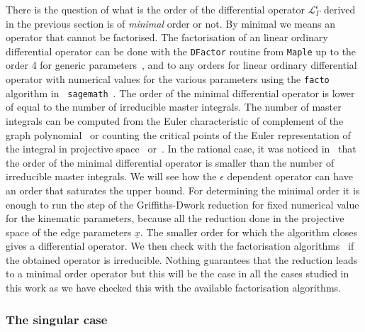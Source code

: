 \documentclass[a4paper,12pt]{article}
\numberwithin{equation}{section}
\numberwithin{figure}{section}
\begin{document}
There is the question of what is the order of the differential
operator  $\mathscr{L}_\Gamma^\epsilon$  derived in the previous
section is of \emph{minimal} order or not.  By minimal we means an
operator that cannot be factorised. The factorisation of an linear ordinary
differential operator can be done with the {\tt DFactor} routine from
{\tt Maple} up to the order 4 for generic parameters~\cite{PutSinger,vanHoeij}, and to any
orders for linear  ordinary
differential operator with numerical values for the various parameters
using the {\tt facto} algorithm in {\tt
	sagemath}~\cite{chyzak2022symbolic,goyer2021sage}.
The order of the minimal differential operator is lower of equal to
the number of irreducible master integrals. The number of master
integrals  can be computed from the Euler
characteristic of complement of the graph polynomial~\cite{Bitoun:2017nre} or counting the
critical points of the Euler representation of the integral in
projective
space~\cite{Lee:2013hzt,Cacciatori:2021nli,Agostini:2022cgv} or~\cite{Mastrolia:2018uzb,Frellesvig:2019uqt}.   In the rational case, it was noticed
in~\cite{Bloch:2013tra,Bloch:2016izu,Bloch:2014qca,Lairez:2022zkj} that the order of the minimal differential operator is
smaller than the number of irreducible master integrals. We will see
how the $\epsilon$ dependent operator can have an order that saturates
the upper bound.
For
determining the minimal order it is enough to run the step of the
Griffiths-Dwork reduction for fixed numerical value for the kinematic
parameters, because all the reduction done in the projective space of
the edge parameters $\underline x$. The smaller order for which the
algorithm closes gives a differential operator. We then check with the
factorisation algorithms~\cite{chyzak2022symbolic,goyer2021sage} if
the obtained operator is irreducible. Nothing guarantees that the reduction leads to
a minimal order operator but this will be  the case in all the cases
studied in this work as we have checked this with the available
factorisation algorithms.

\subsubsection{The singular case}
\label{sec:singular-case}
\end{document}
